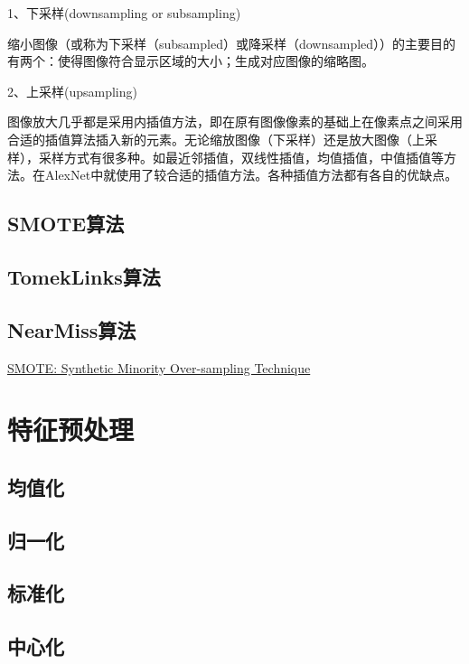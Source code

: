 1、下采样(downsampling or subsampling)

缩小图像（或称为下采样（subsampled）或降采样（downsampled））的主要目的有两个：使得图像符合显示区域的大小；生成对应图像的缩略图。

2、上采样(upsampling)

图像放大几乎都是采用内插值方法，即在原有图像像素的基础上在像素点之间采用合适的插值算法插入新的元素。无论缩放图像（下采样）还是放大图像（上采样），采样方式有很多种。如最近邻插值，双线性插值，均值插值，中值插值等方法。在AlexNet中就使用了较合适的插值方法。各种插值方法都有各自的优缺点。


\subsection{SMOTE算法}

\subsection{TomekLinks算法}

\subsection{NearMiss算法}

\href{https://xueshu.baidu.com/usercenter/paper/show?paperid=28300870422e64fd0ac338860cd0010a&site=xueshu_se}{SMOTE: Synthetic Minority Over-sampling Technique}

\section{特征预处理}

\subsection{均值化}

\subsection{归一化}

\subsection{标准化}

\subsection{中心化}


